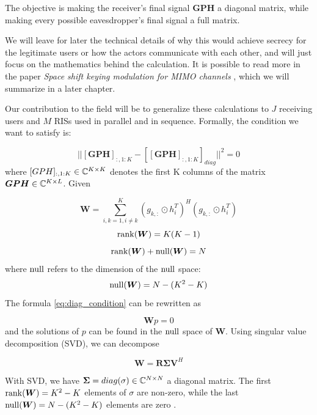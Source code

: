 The objective is making the receiver's final signal $\bm{GPH}$ a diagonal matrix, while making every possible eavesdropper's final signal a full matrix.

We will leave for later the technical details of why this would achieve secrecy for the legitimate users or how the actors communicate with each other, and will just focus on the mathematics behind the calculation. It is possible to read more in the paper \textit{Space shift keying modulation for MIMO channels} \cite{5165332}, which we will summarize in a later chapter.

Our contribution to the field will be to generalize these calculations to $J$ receiving users and $M$ RISs used in parallel and in sequence.
Formally, the condition we want to satisfy is:

\begin{equation}
  || [\bm{GPH}]_{:,1:K} - [[\bm{GPH}]_{:,1:K}]_{diag} || ^2 = 0
  \label{eq:diag_condition}
\end{equation}
where $[GPH]_{:,1:K} \in \mathbb{C}^{K \times K}$ denotes the first K columns of the matrix $\bm{GPH} \in \mathbb{C}^{K \times L}$.
Given

\begin{equation}
  \bm{W} = \sum_{i,k = 1, i \ne k}^{K} (g_{k,:} \odot h_i^T)^H (g_{k,:} \odot h_i^T)
\end{equation}
\begin{equation}
  \operatorname{rank}(\bm{W}) = K(K-1)
\end{equation}
\begin{equation}
  \operatorname{rank}(\bm{W}) + \operatorname{null}(\bm{W}) = N
\end{equation}
where $\operatorname{null}$ refers to the dimension of the $\operatorname{null}$ space:
\begin{equation}
  \operatorname{null}(\bm{W}) = N - (K^2 - K)
\end{equation}
The formula \eqref{eq:diag_condition} can be rewritten as

\begin{equation}\bm{W}p = 0\end{equation}
and the solutions of $p$ can be found in the $\operatorname{null}$ space of $\bm{W}$. Using singular value decomposition (SVD), we can decompose

\begin{equation}
  \bm{W} = \bm{R \Sigma V}^H
\end{equation}

With SVD, we have $\bm{\Sigma} = diag(\sigma) \in \mathbb{C}^{N \times N}$ a diagonal matrix. The first $\operatorname{rank}(\bm{W}) = K^2-K$ elements of $\sigma$ are non-zero, while the last $\operatorname{null}(\bm{W}) = N - (K^2-K)$ elements are zero \cite{svd}.


